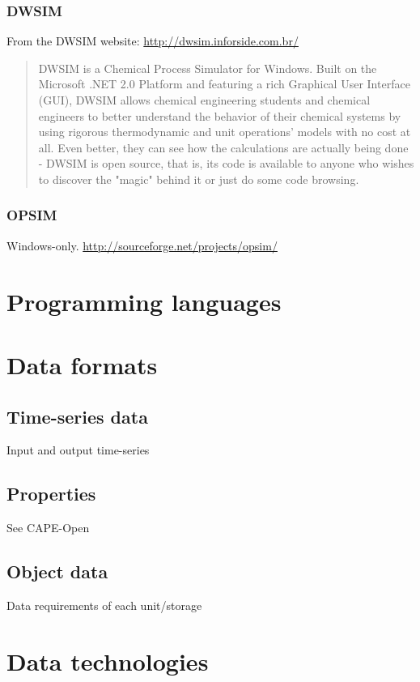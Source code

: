 \subsubsection{DWSIM}
\label{sec:dwsim}

From the DWSIM website: \url{http://dwsim.inforside.com.br/}
\begin{quote}
DWSIM is a Chemical Process Simulator for Windows. Built on the Microsoft .NET 2.0 Platform and featuring a rich Graphical User Interface (GUI), DWSIM allows chemical engineering students and chemical engineers to better understand the behavior of their chemical systems by using rigorous thermodynamic and unit operations' models with no cost at all. Even better, they can see how the calculations are actually being done - DWSIM is open source, that is, its code is available to anyone who wishes to discover the "magic" behind it or just do some code browsing. 
\end{quote}

\subsubsection{OPSIM}
\label{sec:opsim}
Windows-only.  \url{http://sourceforge.net/projects/opsim/}

\section{Programming languages}
\citep{chaves.nehrbass.ea2006octave}

\section{Data formats}
\subsection{Time-series data}
Input and output time-series

\subsection{Properties}
See CAPE-Open

\subsection{Object data}
Data requirements of each unit/storage

\section{Data technologies}

